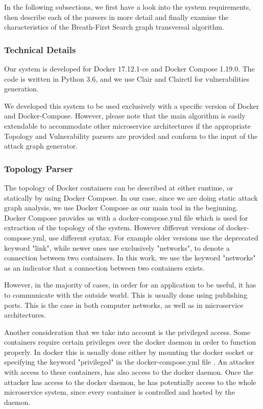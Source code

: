 \documentclass[letterpaper, 10 pt, conference]{ieeeconf}  %
\begin{document}
In the following subsections, we first have a look into the system requirements, then describe each of the parsers in more detail and finally examine the characteristics of the Breath-First Search graph transversal algorithm.

\subsubsection{Technical Details}
Our system is developed for Docker 17.12.1-ce and Docker Compose 1.19.0. The code is written in Python 3.6, and we use Clair\cite{clair} and Clairctl\cite{clairctl} for vulnerabilities generation.

We developed this system to be used exclusively with a specific version of Docker and Docker-Compose. However, please note that the main algorithm is easily extendable to accommodate other microservice architectures if the appropriate Topology and Vulnerability parsers are provided and conform to the input of the attack graph generator.

\subsubsection{Topology Parser}
The topology of Docker containers can be described at either runtime, or statically by using Docker Compose. In our case, since we are doing static attack graph analysis, we use Docker Compose as our main tool in the beginning. Docker Compose provides us with a docker-compose.yml file which is used for extraction of the topology of the system. However different versions of docker-compose.yml, use different syntax. For example older versions use the deprecated keyword "link", while newer ones use exclusively "networks", to denote a connection between two containers. In this work, we use the keyword "networks" as an indicator that a connection between two containers exists.

However, in the majority of cases, in order for an application to be useful, it has to communicate with the outside world. This is usually done using publishing ports. This is the case in both computer networks, as well as in microservice architectures.

Another consideration that we take into account is the privileged access. Some containers require certain privileges over the docker daemon in order to function properly. In docker this is usually done either by mounting the docker socket or specifying the keyword "privileged" in the docker-compose.yml file . An attacker with access to these containers, has also access to the docker daemon. Once the attacker has access to the docker daemon, he has potentially access to the whole microservice system, since every container is controlled and hosted by the daemon.
\end{document}
